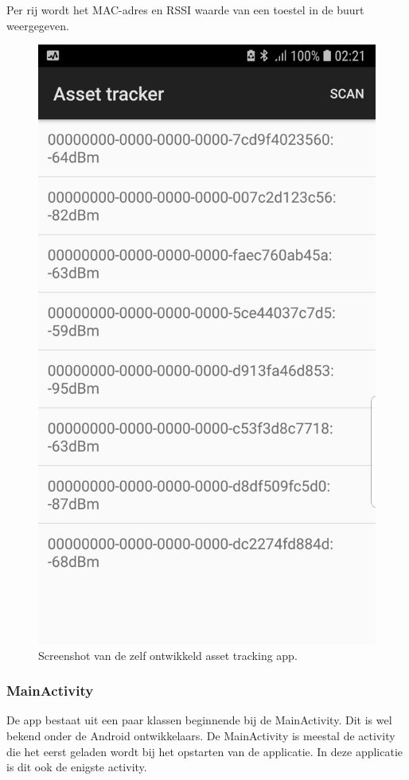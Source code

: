 Per rij wordt het MAC-adres en RSSI waarde van een toestel in de buurt weergegeven.

\begin{figure}
    \includegraphics[width=\linewidth]{app.jpg}
    \caption[Asset tracking app]{Screenshot van de zelf ontwikkeld asset tracking app.}
    \label{fig:app}
\end{figure}

\subsubsection{MainActivity}
De app bestaat uit een paar klassen beginnende bij de MainActivity. Dit is wel bekend onder de Android ontwikkelaars. De MainActivity is meestal de activity die het eerst geladen wordt bij het opstarten van de applicatie. In deze applicatie is dit ook de enigste activity.\\

